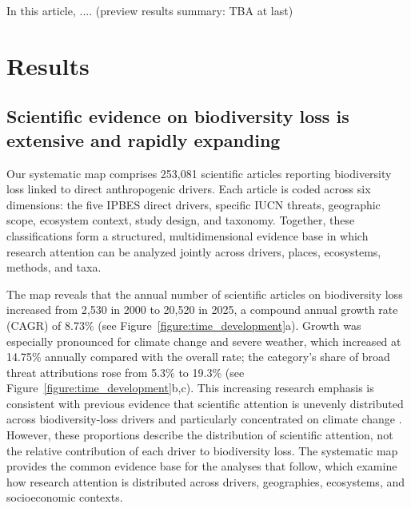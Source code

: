 \documentclass[12pt]{article}
\newcommand{\TODO}[1]{{\color{red}#1}}
\begin{document}
In this article, ....  \TODO{(preview results summary: TBA at last)} 

\section*{Results}
\label{sec:results}

\subsection*{Scientific evidence on biodiversity loss is extensive and rapidly expanding}
Our systematic map comprises 253{,}081 scientific articles reporting biodiversity loss linked to direct anthropogenic drivers. Each article is coded across six dimensions: the five IPBES direct drivers, specific IUCN threats, geographic scope, ecosystem context, study design, and taxonomy. Together, these classifications form a structured, multidimensional evidence base in which research attention can be analyzed jointly across drivers, places, ecosystems, methods, and taxa.

The map reveals that the annual number of scientific articles on biodiversity loss increased from 2{,}530 in 2000 to 20{,}520 in 2025, a compound annual growth rate (CAGR) of 8.73\% (see Figure~\ref{figure:time_development}a). Growth was especially pronounced for climate change and severe weather, which increased at 14.75\% annually compared with the overall rate; the category's share of broad threat attributions rose from 5.3\% to 19.3\% (see Figure~\ref{figure:time_development}b,c). This increasing research emphasis is consistent with previous evidence that scientific attention is unevenly distributed across biodiversity-loss drivers and particularly concentrated on climate change \cite{mazor_et_all_mismatch_of_policy}. However, these proportions describe the distribution of scientific attention, not the relative contribution of each driver to biodiversity loss. The systematic map provides the common evidence base for the analyses that follow, which examine how research attention is distributed across drivers, geographies, ecosystems, and socioeconomic contexts.
\end{document}
